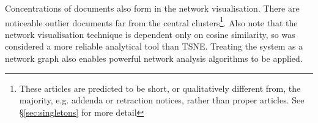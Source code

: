 Concentrations of documents also form in the network visualisation. There are noticeable outlier documents far from the central clusters\footnote{These articles are predicted to be short, or qualitatively different from, the majority, e.g. addenda or retraction notices, rather than proper articles. See \S\ref{sec:singletons} for more detail}. Also note that the network visualisation technique is dependent only on cosine similarity, so was considered a more reliable analytical tool than TSNE. Treating the system as a network graph also enables powerful network analysis algorithms to be applied.
